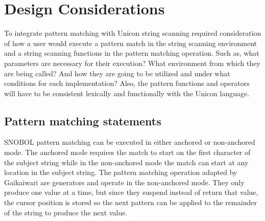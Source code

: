 \documentclass{article}
\begin{document}


\section{Design Considerations}
To integrate pattern matching with Unicon string scanning required consideration of how a user would execute a pattern match in the string scanning environment and a string scanning functions in the pattern matching operation.  Such as, what parameters are necessary for their execution?  What environment from which they are being called?  And how they are going to be utilized and under what conditions for each implementation?  Also, the pattern functions and operators will have to be consistent lexically and functionally with the Unicon language.

\subsection{Pattern matching statements}
SNOBOL pattern matching can be executed in either anchored or non-anchored mode.  The anchored mode requires the match to start on the first character of the subject string while in the non-anchored mode the match can start at any location in the subject string.\cite{Snobol}  The pattern matching operation adapted by Gaikaiwari are generators and operate in the non-anchored mode.\cite{Gaikaiwari2005}  They only produce one value at a time, but since they suspend instead of return that value, the cursor position is stored so the next pattern can be applied to the remainder of the string to produce the next value. \cite{JefferyUnicon}
\end{document}
